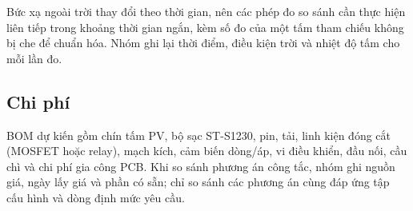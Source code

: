 Bức xạ ngoài trời thay đổi theo thời gian, nên các phép đo so sánh cần thực hiện liên tiếp trong khoảng thời gian ngắn, kèm số đo của một tấm tham chiếu không bị che để chuẩn hóa. Nhóm ghi lại thời điểm, điều kiện trời và nhiệt độ tấm cho mỗi lần đo.

\subsection{Chi phí}

BOM dự kiến gồm chín tấm PV, bộ sạc ST-S1230, pin, tải, linh kiện đóng cắt (MOSFET hoặc relay), mạch kích, cảm biến dòng/áp, vi điều khiển, đầu nối, cầu chì và chi phí gia công PCB. Khi so sánh phương án công tắc, nhóm ghi nguồn giá, ngày lấy giá và phần có sẵn; chỉ so sánh các phương án cùng đáp ứng tập cấu hình và dòng định mức yêu cầu.
